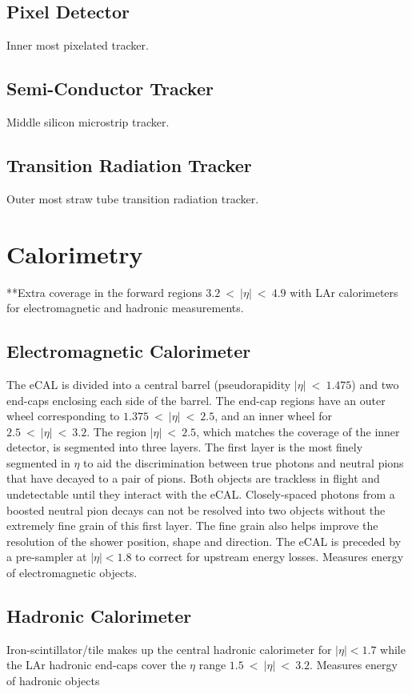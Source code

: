 \subsection{Pixel Detector}
Inner most pixelated tracker.
\subsection{Semi-Conductor Tracker}
Middle silicon microstrip tracker.
\subsection{Transition Radiation Tracker}
Outer most straw tube transition radiation tracker.

\section{Calorimetry}
**Extra coverage in the forward regions $3.2~<~|\eta|~<~4.9$ with LAr calorimeters for electromagnetic and hadronic measurements.
\subsection{Electromagnetic Calorimeter}
The eCAL is divided into a central barrel (pseudorapidity $|\eta|~<~1.475$) and two end-caps enclosing each side of the barrel.  The end-cap regions have an outer wheel corresponding to $1.375~<~|\eta|~<~2.5$, and an inner wheel for $2.5~<~|\eta|~<~3.2$.  The region $|\eta|~<~2.5$, which matches the coverage of the inner detector, is segmented into three layers.  The first layer is the most finely segmented in $\eta$ to aid the discrimination between true photons and neutral pions that have decayed to a pair of pions.  Both objects are trackless in flight and undetectable until they interact with the eCAL.  Closely-spaced photons from a boosted neutral pion decays can not be resolved into two objects without the extremely fine grain of this first layer.  The fine grain also helps improve the resolution of the shower position, shape and direction.  The eCAL is preceded by a pre-sampler at $|\eta| < 1.8$ to correct for upstream energy losses.
Measures energy of electromagnetic objects.

\subsection{Hadronic Calorimeter}
Iron-scintillator/tile makes up the central hadronic calorimeter for $|\eta| < 1.7$ while the LAr hadronic end-caps cover the $\eta$ range $1.5~<~|\eta|~<~3.2$.  
Measures energy of hadronic objects

